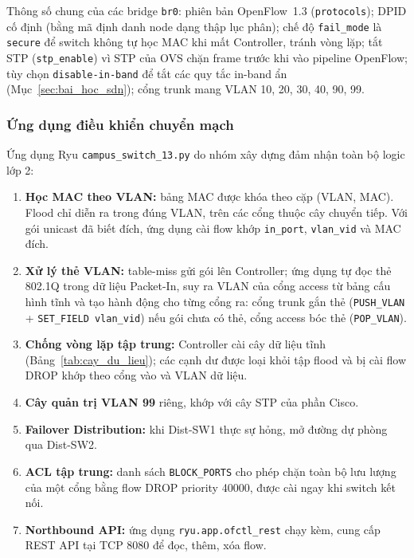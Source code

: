 Thông số chung của các bridge \texttt{br0}: phiên bản OpenFlow~1.3 (\texttt{protocols});  DPID cố định (bằng mã định danh node dạng thập lục phân); chế độ \texttt{fail\_mode} là \texttt{secure} để switch không tự học MAC khi mất Controller, tránh vòng lặp; tắt STP (\texttt{stp\_enable}) vì STP của OVS chặn frame trước khi vào pipeline OpenFlow; tùy chọn \texttt{disable-in-band} để tắt các quy tắc in-band ẩn (Mục~\ref{sec:bai_hoc_sdn}); cổng trunk mang VLAN 10, 20, 30, 40, 90, 99.

\subsubsection{Ứng dụng điều khiển chuyển mạch}

Ứng dụng Ryu \texttt{campus\_switch\_13.py} do nhóm xây dựng đảm nhận toàn bộ logic lớp 2:

\begin{enumerate}
    \item \textbf{Học MAC theo VLAN:} bảng MAC được khóa theo cặp (VLAN, MAC). Flood chỉ diễn ra trong đúng VLAN, trên các cổng thuộc cây chuyển tiếp. Với gói unicast đã biết đích, ứng dụng cài flow khớp \texttt{in\_port}, \texttt{vlan\_vid} và MAC đích.
    \item \textbf{Xử lý thẻ VLAN:} table-miss gửi gói lên Controller; ứng dụng tự đọc thẻ 802.1Q trong dữ liệu Packet-In, suy ra VLAN của cổng access từ bảng cấu hình tĩnh và tạo hành động cho từng cổng ra: cổng trunk gắn thẻ (\texttt{PUSH\_VLAN} + \texttt{SET\_FIELD vlan\_vid}) nếu gói chưa có thẻ, cổng access bóc thẻ (\texttt{POP\_VLAN}).
    \item \textbf{Chống vòng lặp tập trung:} Controller cài cây dữ liệu tĩnh (Bảng~\ref{tab:cay_du_lieu}); các cạnh dư được loại khỏi tập flood và bị cài flow DROP khớp theo cổng vào và VLAN dữ liệu.
    \item \textbf{Cây quản trị VLAN 99} riêng, khớp với cây STP của phần Cisco.
    \item \textbf{Failover Distribution:} khi Dist-SW1 thực sự hỏng, mở đường dự phòng qua Dist-SW2.
    \item \textbf{ACL tập trung:} danh sách \texttt{BLOCK\_PORTS} cho phép chặn toàn bộ lưu lượng của một cổng bằng flow DROP priority 40000, được cài ngay khi switch kết nối.
    \item \textbf{Northbound API:} ứng dụng \texttt{ryu.app.ofctl\_rest} chạy kèm, cung cấp REST API tại TCP 8080 để đọc, thêm, xóa flow.
\end{enumerate}

